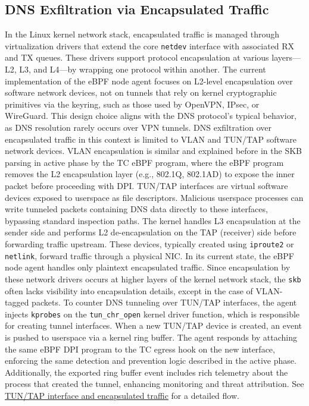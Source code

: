 \documentclass [11pt, proquest] {uwthesis}[2020/02/24]
\begin{document}
\subsection{DNS Exfiltration via Encapsulated Traffic}
In the Linux kernel network stack, encapsulated traffic is managed through virtualization drivers that extend the core \texttt{netdev} interface with associated RX and TX queues. These drivers support protocol encapsulation at various layers—L2, L3, and L4—by wrapping one protocol within another. 
The current implementation of the eBPF node agent focuses on L2-level encapsulation over software network devices, not on tunnels that rely on kernel cryptographic primitives via the keyring, such as those used by OpenVPN, IPsec, or WireGuard. This design choice aligns with the DNS protocol’s typical behavior, as DNS resolution rarely occurs over VPN tunnels. DNS exfiltration over encapsulated traffic in this context is limited to VLAN and TUN/TAP software network devices. VLAN encapsulation is similar and explained before in the SKB parsing in active phase by the TC eBPF program, where the eBPF program removes the L2 encapsulation layer (e.g., 802.1Q, 802.1AD) to expose the inner packet before proceeding with DPI.
TUN/TAP interfaces are virtual software devices exposed to userspace as file descriptors. Malicious userspace processes can write tunneled packets containing DNS data directly to these interfaces, bypassing standard inspection paths. The kernel handles L3 encapsulation at the sender side and performs L2 de-encapsulation on the TAP (receiver) side before forwarding traffic upstream. These devices, typically created using \texttt{iproute2} or \texttt{netlink}, forward traffic through a physical NIC. In its current state, the eBPF node agent handles only plaintext encapsulated traffic. Since encapsulation by these network drivers occurs at higher layers of the kernel network stack, the \texttt{skb} often lacks visibility into encapsulation details, except in the case of VLAN-tagged packets. To counter DNS tunneling over TUN/TAP interfaces, the agent injects \texttt{kprobes} on the \texttt{tun\_chr\_open} kernel driver function, which is responsible for creating tunnel interfaces. When a new TUN/TAP device is created, an event is pushed to userspace via a kernel ring buffer. The agent responds by attaching the same eBPF DPI program to the TC egress hook on the new interface, enforcing the same detection and prevention logic described in the active phase. 
Additionally, the exported ring buffer event includes rich telemetry about the process that created the tunnel, enhancing monitoring and threat attribution. See \hyperref[subsec:tun_encap]{TUN/TAP interface and encapsulated traffic} for a detailed flow.
\end{document}
